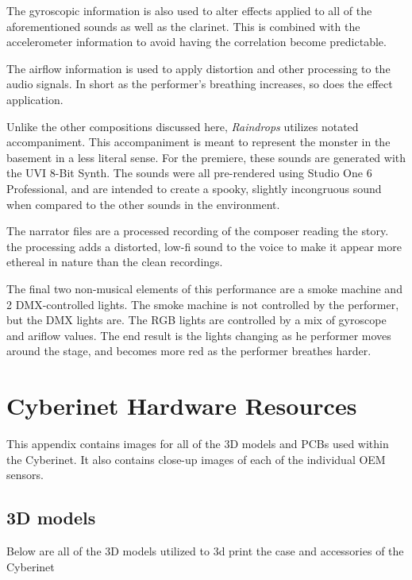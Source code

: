 The gyroscopic information is also used to alter effects applied to all of the aforementioned sounds as well as the clarinet. This is combined with the accelerometer information to avoid having the correlation become predictable.

The airflow information is used to apply distortion and other processing to the audio signals. In short as the performer's breathing increases, so does the effect application.

Unlike the other compositions discussed here, \textit{Raindrops} utilizes notated accompaniment. This accompaniment is meant to represent the monster in the basement in a less literal sense. For the premiere, these sounds are generated with the UVI 8-Bit Synth. The sounds were all pre-rendered using Studio One 6 Professional, and are intended to create a spooky, slightly incongruous sound when compared to the other sounds in the environment. 

The narrator files are a processed recording of the composer reading the story. the processing adds a distorted, low-fi sound to the voice to make it appear more ethereal in nature than the clean recordings. 

The final two non-musical elements of this performance are a smoke machine and 2 DMX-controlled lights. The smoke machine is not controlled by the performer, but the DMX lights are. The RGB lights are controlled by a mix of gyroscope and ariflow values. The end result is the lights changing as he performer moves around the stage, and becomes more red as the performer breathes harder.



\appendix

\chapter{Cyberinet Hardware Resources}
This appendix contains images for all of the 3D models and PCBs used within the Cyberinet. It also contains close-up images of each of the individual OEM sensors.

\section{3D models}
Below are all of the 3D models utilized to 3d print the case and accessories of the Cyberinet

